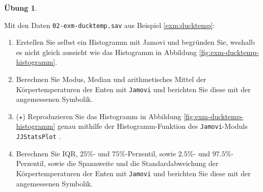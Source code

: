 \documentclass[
]{book}
\providecommand{\tightlist}{%
  \setlength{\itemsep}{0pt}\setlength{\parskip}{0pt}}
\theoremstyle{definition}
\theoremstyle{definition}
\theoremstyle{definition}
\newtheorem{exercise}{Übung}[chapter]
\theoremstyle{definition}
\theoremstyle{remark}
\begin{document}
\begin{exercise}
\protect\hypertarget{exr:enten-hist-mean-sd}{}\label{exr:enten-hist-mean-sd}\leavevmode

Mit den Daten \texttt{02-exm-ducktemp.sav} aus Beispiel \ref{exm:ducktemp}:

\begin{enumerate}
\def\labelenumi{(\alph{enumi})}
\tightlist
\item
  Erstellen Sie selbst ein Histogramm mit Jamovi und begründen Sie, weshalb es nicht gleich aussieht wie das Histogramm in Abbildung \ref{fig:exm-ducktemp-histogramm}.
\item
  Berechnen Sie Modus, Median und arithmetisches Mittel der Körpertemperaturen der Enten mit \texttt{Jamovi} und berichten Sie diese mit der angemessenen Symbolik.
\item
  (\(\star\)) Reproduzieren Sie das Histogramm in Abbildung \ref{fig:exm-ducktemp-histogramm} genau mithilfe der Histogramm-Funktion des \texttt{Jamovi}-Moduls \texttt{JJStatsPlot} \citep{jjstatsplot2025}.
\item
  Berechnen Sie IQR, \(25\%\)- und \(75\%\)-Perzentil, sowie \(2.5\%\)- und \(97.5\%\)-Perzentil, sowie die Spannweite und die Standardabweichung der Körpertemperaturen der Enten mit \texttt{Jamovi} und berichten Sie diese mit der angemessenen Symbolik.
\end{enumerate}

\end{exercise}
\end{document}
